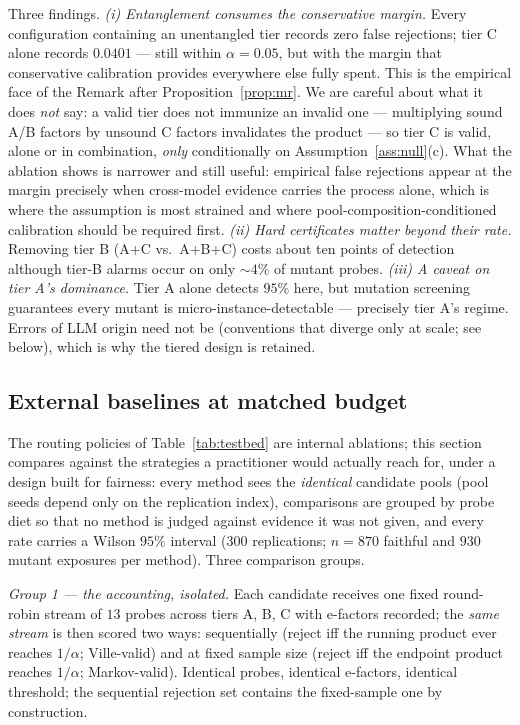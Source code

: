 \documentclass[pdflatex,sn-mathphys-num]{sn-jnl}
\theoremstyle{thmstyleone}
\theoremstyle{thmstyletwo}
\begin{document}
Three findings. \emph{(i) Entanglement consumes the conservative
margin.} Every configuration containing an unentangled tier records
zero false rejections; tier C alone records $0.0401$ --- still within
$\alpha = 0.05$, but with the margin that conservative calibration
provides everywhere else fully spent. This is the empirical face of
the Remark after Proposition~\ref{prop:mr}. We are careful about what
it does \emph{not} say: a valid tier does not immunize an invalid one
--- multiplying sound A/B factors by unsound C factors invalidates
the product --- so tier C is valid, alone or in combination,
\emph{only} conditionally on Assumption~\ref{ass:null}(c). What the
ablation shows is narrower and still useful: empirical false
rejections appear at the margin precisely when cross-model evidence
carries the process alone, which is where the assumption is most
strained and where pool-composition-conditioned calibration should be
required first.
\emph{(ii) Hard certificates matter beyond their rate.} Removing tier
B (A+C vs.\ A+B+C) costs about ten points of detection although
tier-B alarms occur on only ${\sim}4\%$ of mutant probes.
\emph{(iii) A caveat on tier A's dominance.} Tier A alone detects
$95\%$ here, but mutation screening guarantees every mutant is
micro-instance-detectable --- precisely tier A's regime. Errors of
LLM origin need not be (conventions that diverge only at scale;
see below), which is why the tiered design is retained.

\subsection{External baselines at matched budget}\label{sec:baselines}

The routing policies of Table~\ref{tab:testbed} are internal
ablations; this section compares against the strategies a
practitioner would actually reach for, under a design built for
fairness: every method sees the \emph{identical} candidate pools
(pool seeds depend only on the replication index), comparisons are
grouped by probe diet so that no method is judged against evidence it
was not given, and every rate carries a Wilson $95\%$ interval
($300$ replications; $n = 870$ faithful and $930$ mutant
exposures per method). Three comparison groups.

\emph{Group 1 --- the accounting, isolated.} Each candidate receives
one fixed round-robin stream of $13$ probes across tiers A, B, C with
e-factors recorded; the \emph{same stream} is then scored two ways:
sequentially (reject iff the running product ever reaches $1/\alpha$;
Ville-valid) and at fixed sample size (reject iff the endpoint
product reaches $1/\alpha$; Markov-valid). Identical probes,
identical e-factors, identical threshold; the sequential rejection
set contains the fixed-sample one by construction.
\end{document}
